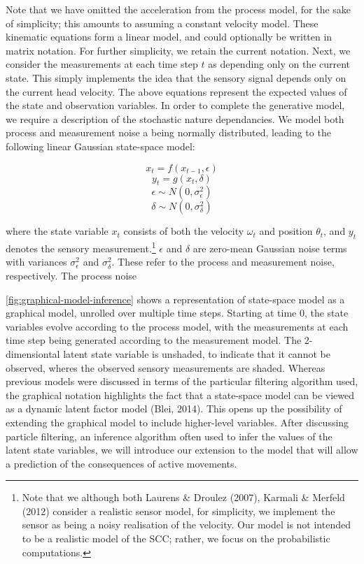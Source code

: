 \documentclass[english,floatsintext,man]{apa6}
\theoremstyle{definition}
\theoremstyle{definition}
\theoremstyle{remark}
\begin{document}
Note that we have omitted the acceleration from the process model, for
the sake of simplicity; this amounts to assuming a constant velocity
model. These kinematic equations form a linear model, and could
optionally be written in matrix notation. For further simplicity, we
retain the current notation. Next, we consider the measurements at each
time step \(t\) as depending only on the current state. This simply
implements the idea that the sensory signal depends only on the current
head velocity. The above equations represent the expected values of the
state and observation variables. In order to complete the generative
model, we require a description of the stochastic nature dependancies.
We model both process and measurement noise a being normally
distributed, leading to the following linear Gaussian state-space model:

\[x_t = f(x_{t-1}, \epsilon)\] \[y_{t} = g(x_t, \delta)\]
\[\epsilon \sim N(0, \sigma^2_\epsilon) \]
\[\delta \sim N(0, \sigma^2_\delta) \]

where the state variable \(x_t\) consists of both the velocity
\(\omega_t\) and position \(\theta_t\), and \(y_{t}\) denotes the
sensory measurement.\footnote{Note that we although both Laurens \&
  Droulez (2007), Karmali \& Merfeld (2012) consider a realistic sensor
  model, for simplicity, we implement the sensor as being a noisy
  realisation of the velocity. Our model is not intended to be a
  realistic model of the SCC; rather, we focus on the probabilistic
  computations.} \(\epsilon\) and \(\delta\) are zero-mean Gaussian
noise terms with variances \(\sigma^2_\epsilon\) and
\(\sigma^2_\delta\). These refer to the process and measurement noise,
respectively. The process noise

\autoref{fig:graphical-model-inference} shows a representation of
state-space model as a graphical model, unrolled over multiple time
steps. Starting at time 0, the state variables evolve according to the
process model, with the measurements at each time step being generated
according to the measurement model. The 2-dimensiontal latent state
variable is unshaded, to indicate that it cannot be observed, wheres the
observed sensory measurements are shaded. Whereas previous models were
discussed in terms of the particular filtering algorithm used, the
graphical notation highlights the fact that a state-space model can be
viewed as a dynamic latent factor model (Blei, 2014). This opens up the
possibility of extending the graphical model to include higher-level
variables. After discussing particle filtering, an inference algorithm
often used to infer the values of the latent state variables, we will
introduce our extension to the model that will allow a prediction of the
consequences of active movements.
\end{document}

